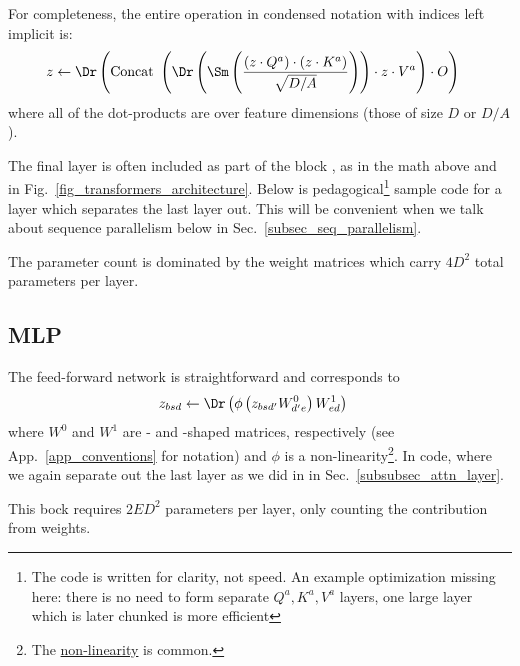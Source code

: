 \documentclass[11pt]{article}
\begin{document}
For completeness, the entire operation in condensed notation with indices left implicit is:
\begin{align}
    z  &\leftarrow \Dr \left ({\rm Concat} \ \left ( \Dr \left (\Sm  \left ( \frac{ \left ( z \cdot Q ^{ a } \right )\cdot \left ( z \cdot K ^{ a } \right )}{ \sqrt{D/A} }
            \right)\right )\cdot z \cdot V ^{ a } \right ) \cdot O \right ) \label{eq_causal_attn}
\end{align}
where all of the dot-products are over feature dimensions (those of size $ D $ or $ D/A $).

The final  layer is often included as part of the  block , as
in the math above and in Fig.~\ref{fig_transformers_architecture}. Below is pedagogical\footnote{The
code is written for clarity, not speed. An example optimization missing here: there is no need to
form separate $ Q ^{ a },K ^{ a },V ^{ a} $  layers, one large layer which is later
chunked is more efficient} sample code for a  layer which separates the
last  layer out. This will be convenient when we talk about sequence parallelism below
in Sec.~\ref{subsec_seq_parallelism}. 

The parameter count is dominated by the weight matrices which carry $ 4 D ^{ 2 } $ total parameters per layer.


\subsection{MLP \label{subsubsec_mlp} }

The feed-forward network is straightforward and corresponds to
\begin{align}
  z _{ bsd } &\leftarrow \Dr \left (\phi \left ( z _{ bsd' }W ^{ 0 }_{ d'e } \right ) W ^{ 1 } _{ ed
      } \right ) \label{eq_mlp}
\end{align}
where $ W ^{ 0 } $ and $ W ^{ 1 } $ are - and -shaped matrices,
respectively (see App.~\ref{app_conventions} for notation) and $ \phi $ is a
non-linearity\footnote{The 
\href{https://pytorch.org/docs/stable/generated/torch.nn.GELU.html}{non-linearity} is common.}.
In code, where we again separate out the last  layer as we did in in
Sec.~\ref{subsubsec_attn_layer}.  

This bock requires $ 2 E D ^{ 2 } $ parameters per layer, only counting the contribution from
weights.
\end{document}
